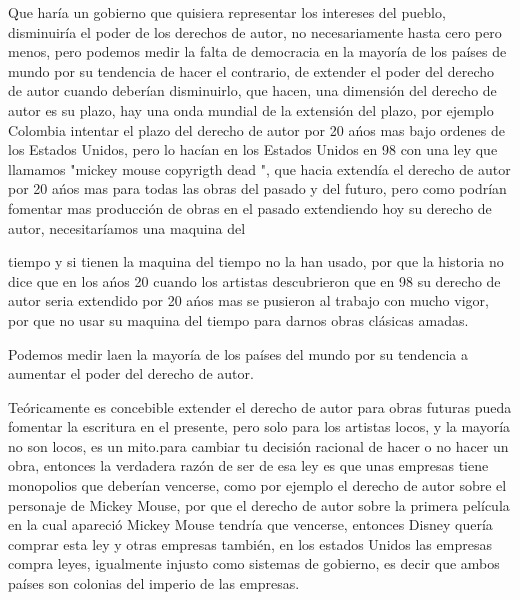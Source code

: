 \begin{multicols}{2}
Que haría un gobierno que quisiera representar los intereses del pueblo, disminuiría el poder de los derechos de autor, no necesariamente hasta cero pero menos, pero podemos medir la falta de democracia en la mayoría de los países de mundo por su tendencia de hacer el contrario, de extender el poder del derecho de autor cuando deberían disminuirlo, que hacen, una dimensión del derecho de autor es su plazo, hay una onda mundial de la extensión del plazo, por ejemplo Colombia intentar el plazo del derecho de autor por 20 ańos mas bajo ordenes de los Estados Unidos, {\em {\color{introcolor}{ por que Colombia a perdido su independencia, }}} pero lo hacían en los Estados Unidos en 98 con una ley que llamamos "mickey mouse copyrigth dead ", que hacia extendía el derecho de autor por 20 ańos mas para todas las obras del pasado y del futuro, pero como podrían fomentar mas producción de obras en el pasado extendiendo hoy su derecho de autor, necesitaríamos una maquina del



tiempo y si tienen la maquina del tiempo no la han usado, por que la historia no dice que en los ańos 20 cuando los artistas descubrieron que en 98 su derecho de autor seria extendido por 20 ańos mas se pusieron al trabajo con mucho vigor, por que no usar su maquina del tiempo para darnos obras clásicas amadas.


\begin{entradilla} %
Podemos medir la{\em {\color{introcolor}{ falta de democracia }}}en la mayoría de los países del mundo por su tendencia a aumentar el poder del derecho de autor.
\end{entradilla}



Teóricamente es concebible extender el derecho de autor para obras futuras pueda fomentar la escritura en el presente, pero solo para los artistas locos, y la mayoría no son locos, es un mito.{\em {\color{introcolor}{ Según la economía, el valor actual actual descontado de 20 ańos mas de derecho de autor comenzando 50 ańos después de tu muerte es demasiado poco, }}}para cambiar tu decisión racional de hacer o no hacer un obra, entonces la verdadera razón de ser de esa ley es que unas empresas tiene monopolios que deberían vencerse, como por ejemplo el derecho de autor sobre el personaje de Mickey Mouse, por que el derecho de autor sobre la primera película en la cual apareció Mickey Mouse tendría que vencerse, entonces Disney quería comprar esta ley  y otras empresas también, en los estados Unidos las empresas compra leyes,{\em {\color{introcolor}{ en Colombia los Estados Unidos ordena leyes, }}} igualmente injusto como sistemas de gobierno, es decir que ambos países son colonias del imperio de las empresas.


\end{multicols}
